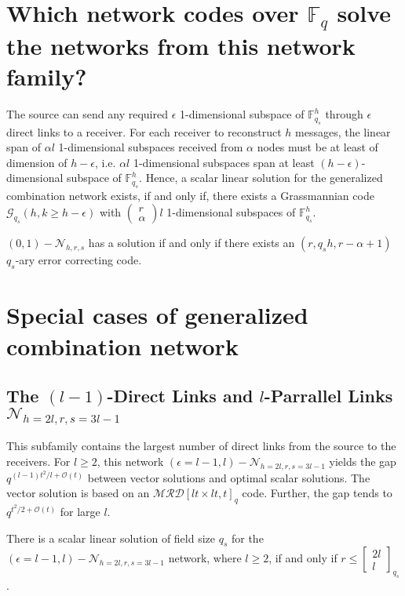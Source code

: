 \section{Which network codes over $\ensuremath{\mathbb{F}}_{q}$ solve the
networks from this network family?}

The source can send any required $\epsilon$ 1-dimensional subspace
of $\ensuremath{\mathbb{F}}_{q_{s}}^{h}$ through $\epsilon$ direct
links to a receiver. For each receiver to reconstruct $h$ messages,
the linear span of $\alpha l$ 1-dimensional subspaces received from
$\alpha$ nodes must be at least of dimension of $h-\epsilon$, i.e.
$\alpha l$ 1-dimensional subspaces span at least $\left(h-\epsilon\right)$-dimensional
subspace of $\ensuremath{\mathbb{F}}_{q_{s}}^{h}$. Hence, a scalar
linear solution for the generalized combination network exists, if
and only if, there exists a Grassmannian code $\mathcal{G}_{q_{s}}\left(h,k\geq h-\epsilon\right)$
with $\left(\begin{array}{c}
r\\
\alpha
\end{array}\right)l$ 1-dimensional subspaces of $\ensuremath{\mathbb{F}}_{q_{s}}^{h}$.
\begin{thm}
$(0,1)-\mathcal{N}_{h,r,s}$ has a solution if and only if there exists
an $\left(r,q_{s}h,r-\alpha+1\right)$ $q_{s}$-ary error correcting
code.
\end{thm}

\section{Special cases of generalized combination network}

\subsection{The $(l-1)$-Direct Links and $l$-Parrallel Links $\mathcal{N}_{h=2l,r,s=3l-1}$}

This subfamily contains the largest number of direct links from the
source to the receivers. For $l\geq2$, this network $\left(\epsilon=l-1,l\right)-\mathcal{N}_{h=2l,r,s=3l-1}$
yields the gap $q^{(l-1)t^{2}/l+\mathcal{O}(t)}$ between vector solutions
and optimal scalar solutions. The vector solution is based on an $\mathcal{MRD}\left[lt\times lt,t\right]_{q}$
code. Further, the gap tends to $q^{t^{2}/2+\mathcal{O}(t)}$ for
large $l$.
\begin{lem}
There is a scalar linear solution of field size $q_{s}$ for the $\left(\epsilon=l-1,l\right)-\mathcal{N}_{h=2l,r,s=3l-1}$
network, where $l\geq2$, if and only if $r\leq\left[\begin{array}{c}
2l\\
l
\end{array}\right]_{q_{s}}$.
\end{lem}

